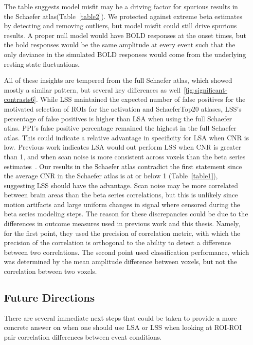 \documentclass[phd,figures,tables,ackpage,abstractpage,publicabstractpage]{uithesis}
\begin{document}
The table suggests model misfit may be a driving factor for spurious results in the Schaefer atlas(Table~\ref{table2}).
We protected against extreme beta estimates by detecting and removing outliers, but model misfit
could still drive spurious results.
A proper null model would have BOLD responses at the onset times, but the bold responses
would be the same amplitude at every event such that the only deviance in the simulated
BOLD responses would come from the underlying resting state fluctuations.

All of these insights are tempered from the full Schaefer atlas, which showed mostly a similar pattern,
but several key differences as well~\ref{fig:significant-contrasts6}.
While LSS maintained the expected number of false positives for the motivated selection of
ROIs for the activation and SchaeferTop20 atlases, LSS's percentage of false positives is
higher than LSA when using the full Schaefer atlas.
PPI's false positive percentage remained the highest in the full Schaefer atlas.
This could indicate a relative advantage in specificity for LSA when CNR is low.
Previous work indicates LSA would out perform LSS when CNR is greater than 1,
and when scan noise is more consistent across voxels than the beta series estimates~\cite{Abdulrahman2016}.
Our results in the Schaefer atlas contradict the first statement since the average CNR in the Schaefer atlas
is at or below 1 (Table~\ref{table1}), suggesting LSS should have the advantage.
Scan noise may be more correlated between brain areas than the beta series correlations, but this is unlikely
since motion artifacts and large uniform changes in signal where censored during the beta series modeling steps.
The reason for these discrepancies could be due to the differences in outcome measures used in previous work and
this thesis.
Namely, for the first point, they used the precision of correlation metric, with which the precision
of the correlation is orthogonal to the ability to detect a difference between two correlations.
The second point used classification performance, which was determined by the mean amplitude difference
between voxels, but not the correlation between two voxels.

\subsection{Future Directions}

There are several immediate next steps that could be taken to provide a more concrete answer
on when one should use LSA or LSS when looking at ROI-ROI pair correlation differences between event
conditions.
\end{document}
